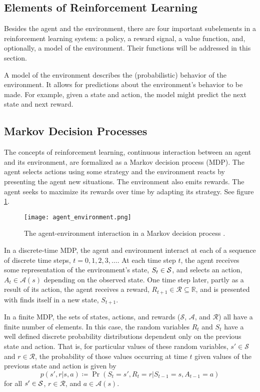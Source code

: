\subsection{Elements of Reinforcement Learning}

Besides the agent and the environment, there are four important subelements in a reinforcement learning system: a policy, a reward signal, a value function, and, optionally, a model of the environment. Their functions will be addressed in this section.

A model of the environment describes the (probabilistic) behavior of the environment. It allows for predictions about the environment’s behavior to be made. For example, given a state and action, the model might predict the next state and next reward.

\subsection{Markov Decision Processes}

The concepts of reinforcement learning, continuous interaction between an agent and its environment, are formalized as a Markov decision process (MDP). The agent selects actions using some strategy and the environment reacts by presenting the agent new situations. The environment also emits rewards. The agent seeks to maximize its rewards over time by adapting its strategy. See figure \ref{fig:agent_environment}.

\begin{figure}[H]
    \centering
    \texttt{[image: agent\_environment.png]}
    \caption{The agent-environment interaction in a Markov decision process \cite{sutton_barto_2012}.}
    \label{fig:agent_environment}
\end{figure}

In a discrete-time MDP, the agent and environment interact at each of a sequence of discrete time steps, $t = 0, 1, 2, 3, \dots$. At each time step $t$, the agent receives some representation of the environment’s state, $S_t \in \S$, and selects an action, $A_t \in \mathcal{A}(s)$ depending on the observed state. One time step later, partly as a result of its action, the agent receives a reward, $R_{t+1} \in \mathcal{R} \subseteq \mathbb{R}$, and is presented with finds itself in a new state, $S_{t+1}$. 

In a finite MDP, the sets of states, actions, and rewards ($\mathcal{S}$, $\mathcal{A}$, and $\mathcal{R}$) all have a finite number of elements. In this case, the random variables $R_t$ and $S_t$ have a well defined discrete probability distributions dependent only on the previous state and action. That is, for particular values of these random variables, $s' \in \mathcal{S}$ and $r \in \mathcal{R}$, the probability of those values occurring at time $t$ given values of the previous state and action is given by
\[
    p(s', r | s, a) \coloneqq \Pr(S_t = s' , R_t = r | S_{t-1} = s, A_{t-1} = a)
 \]
for all $s' \in \S$, $r \in \mathcal{R}$, and $a \in \mathcal{A}(s)$. 

